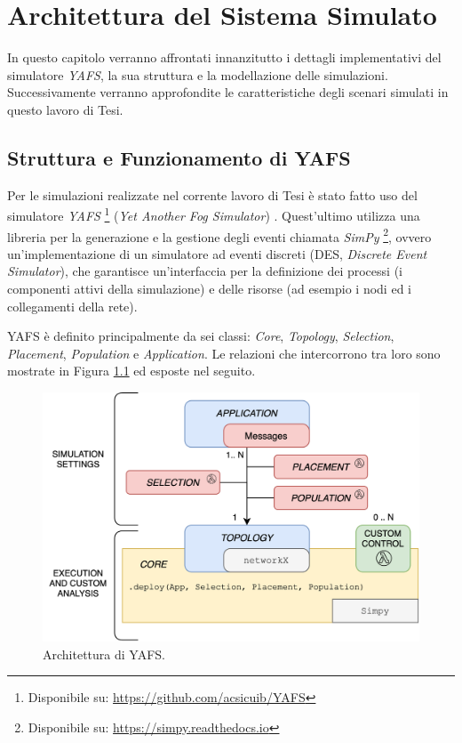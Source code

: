 \chapter{Architettura del Sistema Simulato}	
\label{chapter:architettura}

In questo capitolo verranno affrontati innanzitutto i dettagli implementativi del simulatore \textit{YAFS}, la sua struttura e la modellazione delle simulazioni. Successivamente verranno approfondite le caratteristiche degli scenari simulati in questo lavoro di Tesi.

\section{Struttura e Funzionamento di YAFS}

Per le simulazioni realizzate nel corrente lavoro di Tesi è stato fatto uso del simulatore \textit{YAFS} \footnote{Disponibile su: \url{https://github.com/acsicuib/YAFS}} (\textit{Yet Another Fog Simulator}) \cite{YAFSSimulator}. Quest'ultimo utilizza una libreria per la generazione e la gestione degli eventi chiamata \textit{SimPy} \footnote{Disponibile su: \url{https://simpy.readthedocs.io}}, ovvero un'implementazione di un simulatore ad eventi discreti (DES, \textit{Discrete Event Simulator}), che garantisce un'interfaccia per la definizione dei processi (i componenti attivi della simulazione) e delle risorse (ad esempio i nodi ed i collegamenti della rete).

YAFS è definito principalmente da sei classi: \textit{Core}, \textit{Topology}, \textit{Selection}, \textit{Placement}, \textit{Population} e \textit{Application}. Le relazioni che intercorrono tra loro sono mostrate in Figura \ref{fig:YAFS_classes} ed esposte nel seguito.

\begin{figure}[!ht]
  \includegraphics[width=12cm]{images/YAFS_classes}
  \centering
  \caption[Architettura di YAFS]{Architettura di YAFS.\cite{YAFSSimulator}}
  \label{fig:YAFS_classes}
\end{figure}

